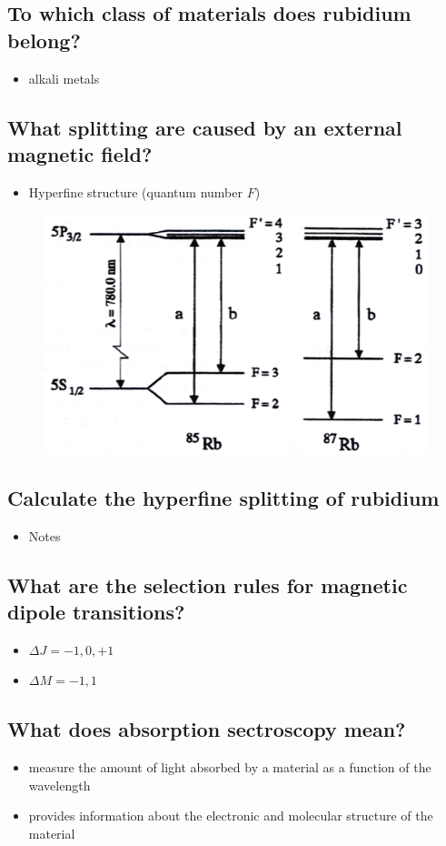 \subsection{To which class of materials does rubidium belong?}
\begin{itemize}
    \item alkali metals
\end{itemize}
\subsection{What splitting are caused by an external magnetic field?}
\begin{itemize}
    \item Hyperfine structure (quantum number $F$)
\end{itemize}
\begin{figure}
    \includegraphics{pictures/Zeeman.png}
\end{figure}
\subsection{Calculate the hyperfine splitting of rubidium}
\begin{itemize}
    \item Notes
\end{itemize}
\subsection{What are the selection rules for magnetic dipole transitions?}
\begin{itemize}
    \item $\Delta J = -1,0,+1$
    \item $\Delta M = -1,1$
\end{itemize}
\subsection{What does absorption sectroscopy mean?}
\begin{itemize}
    \item measure the amount of light absorbed by a material as a function of the wavelength
    \item provides information about the electronic and molecular structure of the material
\end{itemize}